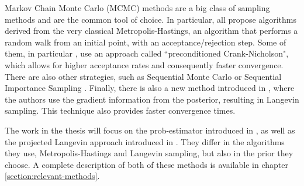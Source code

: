 \documentclass[12pt]{memoir}
\begin{document}
Markov Chain Monte Carlo (MCMC) methods are a big class of sampling methods and are the common tool of choice. In particular, \cite{MA17,Mai22,meth:bayesian:mh:Cotter2013, LLJL20, meth:bayesian:mh:Blume-Kohout-2010} all propose algorithms derived from the very classical Metropolis-Hastings, an algorithm that performs a random walk from an initial point, with an acceptance/rejection step. Some of them, in particular \cite{Mai22,meth:bayesian:mh:Cotter2013, LLJL20}, use an approach called ``preconditioned Crank-Nicholson", which allows for higher acceptance rates and consequently faster convergence. There are also other strategies, such as Sequential Monte Carlo \cite{meth:bayesian:smc:Ferrie-2014,meth:bayesian:smc:Kueng-2015, meth:bayesian:smc:Granade_2016} or Sequential Importance Sampling \cite{meth:bayesian:sis:Kravtsov-2013}. Finally, there is also a new method introduced in \cite{meth:bayesian:Langevin:ACMT2024}, where the authors use the gradient information from the posterior, resulting in Langevin sampling. This technique also provides faster convergence times.\medbreak


The work in the thesis will focus on the prob-estimator introduced in \cite{MA17}, as well as the projected Langevin approach introduced in \cite{meth:bayesian:Langevin:ACMT2024}. They differ in the algorithms they use, Metropolis-Hastings and Langevin sampling, but also in the prior they choose. A complete description of both of these methods is available in chapter \ref{section:relevant-methods}.









\end{document}
